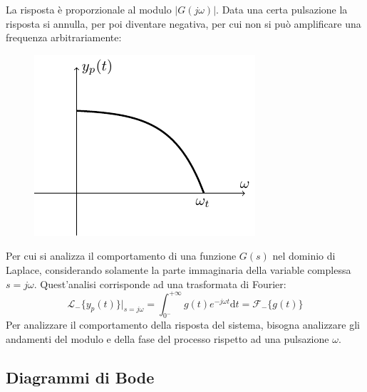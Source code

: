 \documentclass{article}
\numberwithin{equation}{subsection}
\newcommand{\df}{\mathrm{d}}
\begin{document}
La risposta è proporzionale al modulo $|G(j\omega)|$. Data una certa pulsazione la risposta si annulla, per poi diventare negativa, per cui non si può 
amplificare una frequenza arbitrariamente: 
\begin{figure}[H]%
    \centering
    \includegraphics{andamento-frequenza.pdf}%
\end{figure}
Per cui si analizza il comportamento di una funzione $G(s)$ nel dominio di Laplace, considerando solamente la parte immaginaria della variable complessa $s=j\omega$. 
Quest'analisi corrisponde ad una trasformata di Fourier:
\begin{equation*}
    \mathcal{L}_-\{y_p(t)\}\bigg|_{s=j\omega}=\displaystyle\int_{0^-}^{+\infty}g(t)e^{-j\omega t}\df t=\mathscr{F}_-\{g(t)\}
\end{equation*}
Per analizzare il comportamento della risposta del sistema, bisogna analizzare gli andamenti del modulo e della fase del processo rispetto ad una pulsazione $\omega$. 

\subsection{Diagrammi di Bode}
\end{document}
